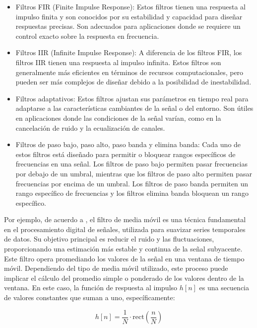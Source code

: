 \documentclass[]{book}
\begin{document}
\begin{itemize}
    \item Filtros FIR (Finite Impulse Response): Estos filtros tienen una respuesta al impulso finita y son conocidos por su estabilidad y capacidad para diseñar respuestas precisas. Son adecuados para aplicaciones donde se requiere un control exacto sobre la respuesta en frecuencia.
    \item Filtros IIR (Infinite Impulse Response): A diferencia de los filtros FIR, los filtros IIR tienen una respuesta al impulso infinita. Estos filtros son generalmente más eficientes en términos de recursos computacionales, pero pueden ser más complejos de diseñar debido a la posibilidad de inestabilidad.
    \item Filtros adaptativos: Estos filtros ajustan sus parámetros en tiempo real para adaptarse a las características cambiantes de la señal o del entorno. Son útiles en aplicaciones donde las condiciones de la señal varían, como en la cancelación de ruido y la ecualización de canales.
    \item  Filtros de paso bajo, paso alto, paso banda y elimina banda: Cada uno de estos filtros está diseñado para permitir o bloquear rangos específicos de frecuencias en una señal. Los filtros de paso bajo permiten pasar frecuencias por debajo de un umbral, mientras que los filtros de paso alto permiten pasar frecuencias por encima de un umbral. Los filtros de paso banda permiten un rango específico de frecuencias y los filtros elimina banda bloquean un rango específico.
\end{itemize}

\noindent Por ejemplo, de acuerdo a \cite{proakis2007digital}, el filtro de media móvil es una técnica fundamental en el procesamiento digital de señales, utilizada para suavizar series temporales de datos. Su objetivo principal es reducir el ruido y las fluctuaciones, proporcionando una estimación más estable y continua de la señal subyacente. Este filtro opera promediando los valores de la señal en una ventana de tiempo móvil. Dependiendo del tipo de media móvil utilizado, este proceso puede implicar el cálculo del promedio simple o ponderado de los valores dentro de la ventana. En este caso, la función de respuesta al impulso \( h[n] \) es una secuencia de valores constantes que suman a uno, específicamente:

\begin{equation}
    h[n] = \frac{1}{N} \cdot \text{rect}\left(\frac{n}{N}\right)
\end{equation}
\end{document}
